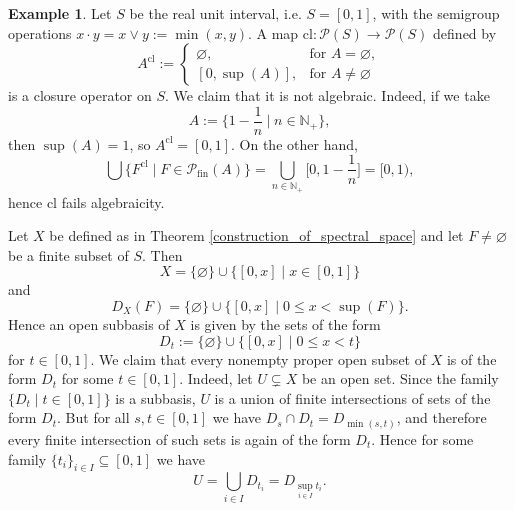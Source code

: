 \documentclass[10pt, reqno]{amsart}
\theoremstyle{plain}
\theoremstyle{definition}
\newtheorem{example}[theorem]{Example}
\begin{document}
\begin{example}
    Let $S$ be the real unit interval, i.e. $S = [0,1]$, with the semigroup operations $x\cdot y = x \lor y := \min(x,y)$. A map $\mathrm{cl} : \mathcal{P}(S) \rightarrow \mathcal{P}(S)$ defined by
    \begin{equation*}
    A^{\mathrm{cl}} := 
    \begin{cases}
        \varnothing, & \text{for } A = \varnothing, \\
        [0, \sup(A)], & \text{for } A \neq \varnothing
    \end{cases}
    \end{equation*}
    is a closure operator on $S$. We claim that it is not algebraic. Indeed, if we take \begin{equation*}
        A := \bigg\{1 - \frac{1}{n} \hspace{3pt} \bigg| \hspace{3pt} n \in \mathbb{N}_{+}\bigg\},
    \end{equation*}
    then $\sup(A) = 1$, so $A^{\mathrm{cl}} = [0,1]$. On the other hand, 
    \begin{equation*}
        \bigcup\{F^{\mathrm{cl}} \mid F \in \mathcal{P}_\mathrm{fin}(A)\} = \bigcup_{n \in\mathbb{N}_+} \bigg[0, 1 - \frac{1}{n}\bigg] = [0, 1), 
    \end{equation*}
    hence $\mathrm{cl}$ fails algebraicity. 
    
    Let $X$ be defined as in Theorem \ref{construction_of_spectral_space} and let $F \neq \varnothing$ be a finite subset of $S$. Then \begin{equation*}
        X = \{\varnothing\} \cup \{[0,x] \mid x \in [0,1]\}
    \end{equation*}
    and 
    \begin{equation*}
        D_X(F) = \{\varnothing\} \cup \{[0, x] \mid 0 \leqslant x < \sup(F)\}. 
    \end{equation*}
    Hence an open subbasis of $X$ is given by the sets of the form $$D_t := \{\varnothing\} \cup \{[0,x] \mid 0 \leqslant x < t\}$$ for $t \in [0, 1].$ We claim that every nonempty proper open subset of $X$ is of the form $D_t$ for some $t\in[0,1]$. Indeed, let $U \subsetneq X$ be an open set. Since the family $\{D_t \mid t \in[0,1]\}$ is a subbasis, $U$ is a union of finite intersections of sets of the form $D_t$. But for all $s, t \in [0,1]$ we have $D_s \cap D_t = D_{\min(s, t)}$, and therefore every finite intersection of such sets is again of the form $D_t$. Hence for some family $\{t_i\}_{i \in I} \subseteq [0,1]$ we have $$U = \bigcup_{i\in I} D_{t_i} = D_{\sup_{i \in I}t_i}.$$
    

\end{example}
\end{document}
